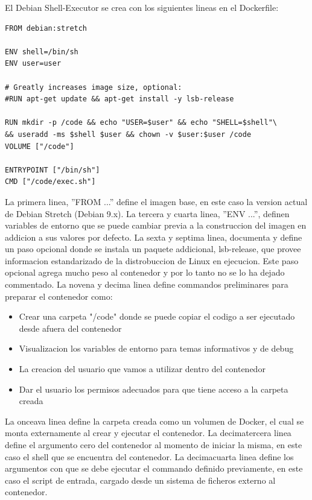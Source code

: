 El Debian Shell-Executor se crea con los siguientes lineas en el Dockerfile: 
\begin{lstlisting}
FROM debian:stretch

ENV shell=/bin/sh
ENV user=user

# Greatly increases image size, optional:
#RUN apt-get update && apt-get install -y lsb-release

RUN mkdir -p /code && echo "USER=$user" && echo "SHELL=$shell"\
&& useradd -ms $shell $user && chown -v $user:$user /code
VOLUME ["/code"]

ENTRYPOINT ["/bin/sh"]
CMD ["/code/exec.sh"]
\end{lstlisting}
La primera linea, ''FROM ...'' define el imagen base, en este caso la version actual de Debian Stretch (Debian 9.x). La tercera y cuarta linea, ''ENV ...'', definen variables de entorno que se puede cambiar previa a la construccion del imagen en addicion a sus valores por defecto. La sexta y septima linea, documenta y define un paso opcional donde se instala un paquete addicional, lsb-release, que provee informacion estandarizado de la distrobuccion de Linux en ejecucion. Este paso opcional agrega mucho peso al contenedor y por lo tanto no se lo ha dejado commentado. La novena y decima linea define commandos preliminares para preparar el contenedor como:
\begin{itemize}
	\item Crear una carpeta "/code" donde se puede copiar el codigo a ser ejecutado desde afuera del contenedor
	\item Visualizacion los variables de entorno para temas informativos y de debug
	\item La creacion del usuario que vamos a utilizar dentro del contenedor
	\item Dar el usuario los permisos adecuados para que tiene acceso a la carpeta creada
\end{itemize}
La onceava linea define la carpeta creada como un volumen de Docker, el cual se monta externamente al crear y ejecutar el contenedor. La decimatercera linea define el argumento cero del contenedor al momento de iniciar la misma, en este caso el shell que se encuentra del contenedor. La decimacuarta linea define los argumentos con que se debe ejecutar el commando definido previamente, en este caso el script de entrada, cargado desde un sistema de ficheros externo al contenedor.

